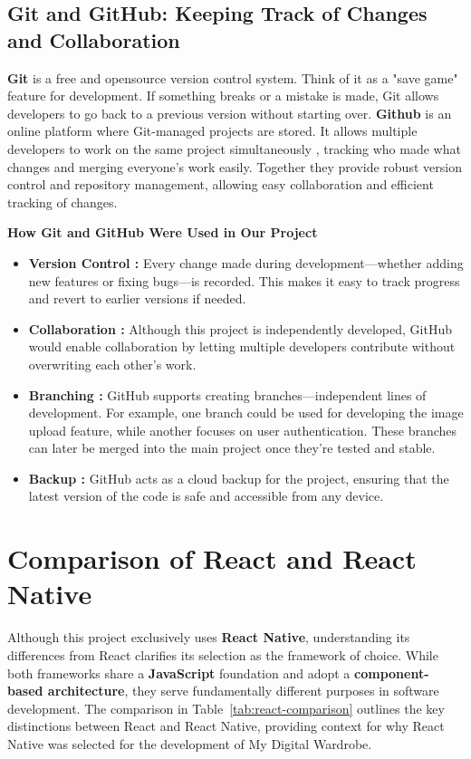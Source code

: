 \subsection{Git and GitHub: Keeping Track of Changes and Collaboration}
   \textbf{Git} is a free and opensource version control system. Think of it as a "save game" feature for development. If something breaks or a mistake is made, Git allows developers to go back to a previous version without starting over. \textbf{Github} is an online platform where Git-managed projects are stored. It allows multiple developers to work on the same project simultaneously , tracking who made what changes and merging everyone’s work easily.  Together they provide robust version control and repository management, allowing easy collaboration and efficient tracking of changes.
   
\textbf{How Git and GitHub Were Used in Our Project}
\begin{itemize}
\item \textbf{Version Control :} Every change made during development—whether adding new features or fixing bugs—is recorded. This makes it easy to track progress and revert to earlier versions if needed.
\item \textbf{Collaboration :} Although this project is independently developed, GitHub would enable collaboration by letting multiple developers contribute without overwriting each other’s work.
\item \textbf{Branching :} GitHub supports creating branches—independent lines of development. For example, one branch could be used for developing the image upload feature, while another focuses on user authentication. These branches can later be merged into the main project once they’re tested and stable.
\item \textbf{Backup :} GitHub acts as a cloud backup for the project, ensuring that the latest version of the code is safe and accessible from any device.
\end{itemize}

\section{Comparison of React and React Native}
Although this project exclusively uses \textbf{React Native}, understanding its differences from React clarifies its selection as the framework of choice. While both frameworks share a \textbf{JavaScript} foundation and adopt a \textbf{component-based architecture}, they serve fundamentally different purposes in software development. The comparison in Table~\ref{tab:react-comparison} outlines the key distinctions between React and React Native, providing context for why React Native was selected for the development of My Digital Wardrobe.


